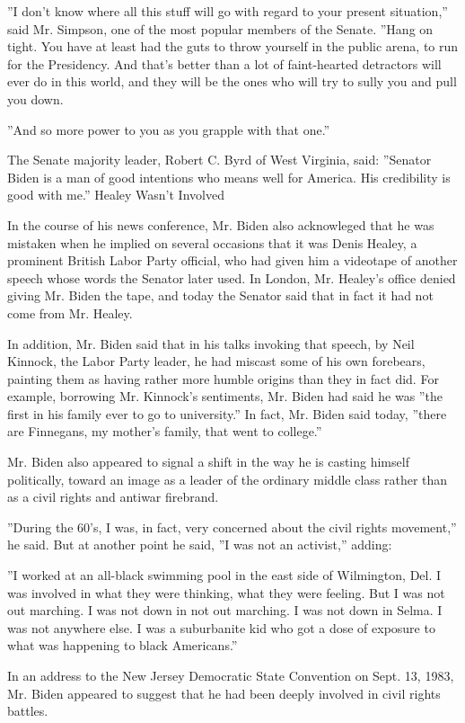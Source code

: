 ''I don't know where all this stuff will go with regard to your present
situation,'' said Mr. Simpson, one of the most popular members of the
Senate. ''Hang on tight. You have at least had the guts to throw
yourself in the public arena, to run for the Presidency. And that's
better than a lot of faint-hearted detractors will ever do in this
world, and they will be the ones who will try to sully you and pull you
down.

''And so more power to you as you grapple with that one.''

The Senate majority leader, Robert C. Byrd of West Virginia, said:
''Senator Biden is a man of good intentions who means well for America.
His credibility is good with me.'' Healey Wasn't Involved

In the course of his news conference, Mr. Biden also acknowleged that he
was mistaken when he implied on several occasions that it was Denis
Healey, a prominent British Labor Party official, who had given him a
videotape of another speech whose words the Senator later used. In
London, Mr. Healey's office denied giving Mr. Biden the tape, and today
the Senator said that in fact it had not come from Mr. Healey.

In addition, Mr. Biden said that in his talks invoking that speech, by
Neil Kinnock, the Labor Party leader, he had miscast some of his own
forebears, painting them as having rather more humble origins than they
in fact did. For example, borrowing Mr. Kinnock's sentiments, Mr. Biden
had said he was ''the first in his family ever to go to university.'' In
fact, Mr. Biden said today, ''there are Finnegans, my mother's family,
that went to college.''

Mr. Biden also appeared to signal a shift in the way he is casting
himself politically, toward an image as a leader of the ordinary middle
class rather than as a civil rights and antiwar firebrand.

''During the 60's, I was, in fact, very concerned about the civil rights
movement,'' he said. But at another point he said, ''I was not an
activist,'' adding:

''I worked at an all-black swimming pool in the east side of Wilmington,
Del. I was involved in what they were thinking, what they were feeling.
But I was not out marching. I was not down in not out marching. I was
not down in Selma. I was not anywhere else. I was a suburbanite kid who
got a dose of exposure to what was happening to black Americans.''

In an address to the New Jersey Democratic State Convention on Sept. 13,
1983, Mr. Biden appeared to suggest that he had been deeply involved in
civil rights battles.

